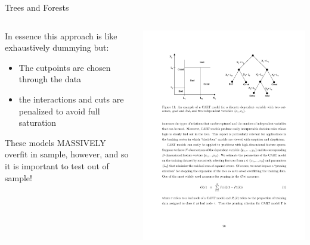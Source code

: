 \documentclass[notes,11pt, aspectratio=169]{beamer}
\newenvironment{wideitemize}{\itemize\addtolength{\itemsep}{10pt}}{\enditemize}
\begin{document}
\begin{frame}{Trees and Forests}
  \begin{columns}[onlytextwidth, T] %
    \begin{column}{.4\textwidth}
      \begin{wideitemize}
      \item In essence this approach is like exhaustively dummying but:
        \begin{itemize}
        \item The cutpoints are chosen through the data
        \item the interactions and cuts are penalized to avoid full
          saturation
        \end{itemize}
      \item These models MASSIVELY overfit in sample, however, and so
        it is important to test out of sample!
      \end{wideitemize}
      \end{column}%
      \hfill%
      \begin{column}{.6\textwidth}
        \includegraphics[width=\linewidth]{images/Tree_Lo.pdf}
      \end{column}%
    \end{columns}
\end{frame}
\end{document}
